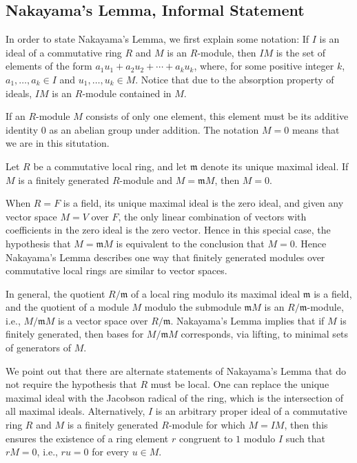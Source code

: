 \documentclass{article}
\begin{document}
\subsection{Nakayama's Lemma, Informal Statement}

In order to state Nakayama's Lemma, we first explain some notation:  If $I$ is an ideal of a commutative ring $R$ and 
 $M$ is an $R$-module, then $IM$ is the set of elements of the form 
	$a_1 u_1 + a_2 u_2 + \cdots + a_k u_k$, where, for some positive integer $k$, $a_1, \ldots, a_k \in I$ and $u_1, \ldots, u_k \in M$.  
Notice that due to the absorption property of ideals, $IM$ is an $R$-module contained in $M$. 	

If an $R$-module $M$ consists of only one element, this element must be its additive identity $0$ as an abelian group under addition.  The notation $M=0$ means that we are in this situtation. 

\begin{nak*}
Let $R$ be a commutative local ring, and let $\mathfrak{m}$ denote its unique maximal ideal. 
If $M$ is a finitely generated $R$-module and $M = \mathfrak{m} M$, then $M = 0$. 
\end{nak*}

When $R=F$ is a field, its unique maximal ideal is the zero ideal, and given any vector space $M=V$ over $F$, the only linear combination of vectors with coefficients in the zero ideal is the zero vector. Hence in this special case, the hypothesis that  $M = \mathfrak{m} M$ is equivalent to the conclusion that $M=0$. 
Hence Nakayama's Lemma describes one way that finitely generated modules over commutative local rings are similar to vector spaces. 

In general, the quotient $R/\mathfrak{m}$ of a local ring modulo its maximal ideal $\mathfrak{m}$ is a field, and the quotient of a module $M$ modulo the submodule $\mathfrak{m}M$ is an $R/\mathfrak{m}$-module, i.e., $M/\mathfrak{m}M$ is a vector space over $R/\mathfrak{m}$. Nakayama's Lemma implies that if $M$ is finitely generated, then bases for $M/\mathfrak{m}M$ corresponds, via lifting, to minimal sets of generators of 
$M$. 

We point out that there are alternate statements of Nakayama's Lemma that do not require the hypothesis that $R$ must be local.  One can replace the unique maximal ideal with the Jacobson radical of the ring, which is the intersection of all maximal ideals. Alternatively, $I$ is an arbitrary proper ideal of a commutative ring $R$ and  
 $M$ is a finitely generated $R$-module for which $M=I M$, then this ensures the existence of a ring element $r$ congruent to $1$ modulo $I$ such that $rM = 0$, i.e., $r u = 0$ for every $u \in M$. 
\end{document}
